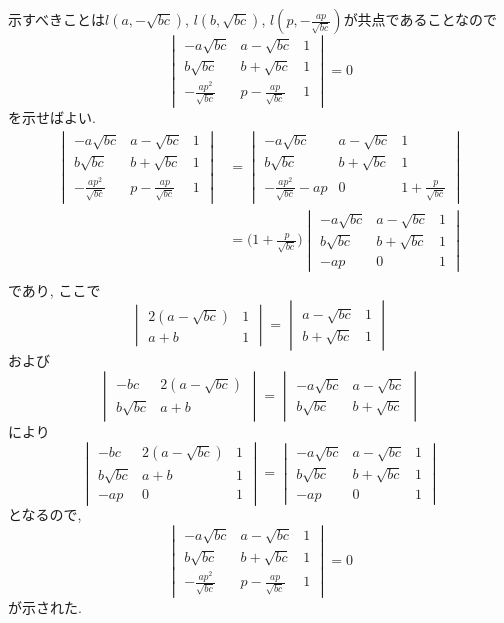 \begin{ifsol*}
示すべきことは$l(a,-\sqrt{bc})$, $l(b,\sqrt{bc})$, $l(p,-\frac{ap}{\sqrt{bc}})$が共点であることなので
\[\begin{vmatrix}
-a\sqrt{bc}&a-\sqrt{bc}&1\\b\sqrt{bc}&b+\sqrt{bc}&1\\-\frac{ap^2}{\sqrt{bc}}&p-\frac{ap}{\sqrt{bc}}&1
\end{vmatrix}=0\]
を示せばよい.
\begin{align*}
\begin{vmatrix}-a\sqrt{bc}&a-\sqrt{bc}&1\\b\sqrt{bc}&b+\sqrt{bc}&1\\-\frac{ap^2}{\sqrt{bc}}&p-\frac{ap}{\sqrt{bc}}&1\end{vmatrix}
&=\begin{vmatrix}-a\sqrt{bc}&a-\sqrt{bc}&1\\b\sqrt{bc}&b+\sqrt{bc}&1\\-\frac{ap^2}{\sqrt{bc}}-ap&0&1+\frac{p}{\sqrt{bc}}\end{vmatrix}\\
&=\biggl(1+\frac{p}{\sqrt{bc}}\biggr)\begin{vmatrix}-a\sqrt{bc}&a-\sqrt{bc}&1\\b\sqrt{bc}&b+\sqrt{bc}&1\\-ap&0&1\end{vmatrix}\\
\end{align*}
であり, ここで
\[\begin{vmatrix}2(a-\sqrt{bc})&1\\a+b&1\end{vmatrix}=\begin{vmatrix}a-\sqrt{bc}&1\\b+\sqrt{bc}&1\end{vmatrix}\]
および
\[\begin{vmatrix}-bc&2(a-\sqrt{bc})\\b\sqrt{bc}&a+b\end{vmatrix}=\begin{vmatrix}-a\sqrt{bc}&a-\sqrt{bc}\\b\sqrt{bc}&b+\sqrt{bc}\end{vmatrix}\]
により
\[\begin{vmatrix}-bc&2(a-\sqrt{bc})&1\\b\sqrt{bc}&a+b&1\\-ap&0&1\end{vmatrix}=\begin{vmatrix}-a\sqrt{bc}&a-\sqrt{bc}&1\\b\sqrt{bc}&b+\sqrt{bc}&1\\-ap&0&1\end{vmatrix}\]
となるので,
\[\begin{vmatrix}
-a\sqrt{bc}&a-\sqrt{bc}&1\\b\sqrt{bc}&b+\sqrt{bc}&1\\-\frac{ap^2}{\sqrt{bc}}&p-\frac{ap}{\sqrt{bc}}&1
\end{vmatrix}=0\]
が示された.
\end{ifsol*}